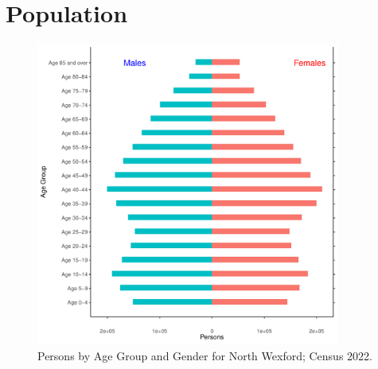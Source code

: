 \documentclass{article}
\begin{document}
\pagebreak

\section{Population} 
\label{sect:Pop}

\begin{figure}[h]
	\centering
	\includegraphics[width = 100mm]{../figures/PyramidPlot.pdf}
	\caption{Persons by Age Group and Gender for North Wexford; Census 2022.}
	\label{fig:2ae19629-1a6a-13a3-e055-000000000001}
	\end{figure}
\end{document}
